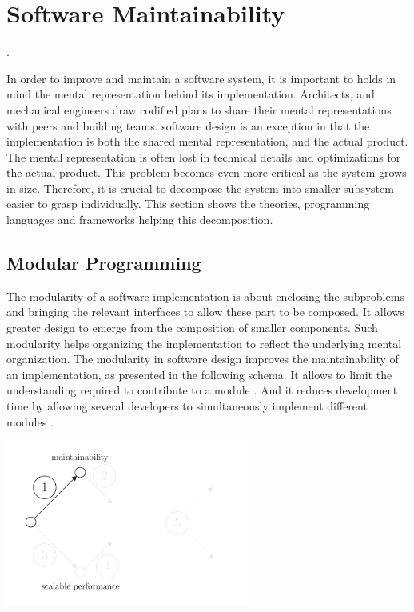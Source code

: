 \section{Software Maintainability} \label{chapter3:software-maintainability}

.

In order to improve and maintain a software system, it is important to holds in mind the mental representation behind its implementation.
Architects, and mechanical engineers draw codified plans to share their mental representations with peers and building teams.
software design is an exception in that the implementation is both the shared mental representation, and the actual product.
The mental representation is often lost in technical details and optimizations for the actual product.
This problem becomes even more critical as the system grows in size.
Therefore, it is crucial to decompose the system into smaller subsystem easier to grasp individually.
This section shows the theories, programming languages and frameworks helping this decomposition.

\subsection{Modular Programming} \label{chapter3:software-maintainability:modular-programming}

The modularity of a software implementation is about enclosing the subproblems and bringing the relevant interfaces to allow these part to be composed.
It allows greater design to emerge from the composition of smaller components.
Such modularity helps organizing the implementation to reflect the underlying mental organization.
The modularity in software design improves the maintainability of an implementation, as presented in the following schema.
It allows to limit the understanding required to contribute to a module \cite{Stevens1974}.
And it reduces development time by allowing several developers to simultaneously implement different modules \cite{Wong2009,Cataldo2006}.

\begin{center}
\includegraphics[width=0.6\textwidth]{../ressources/state-of-the-art-1.pdf}
\end{center}

